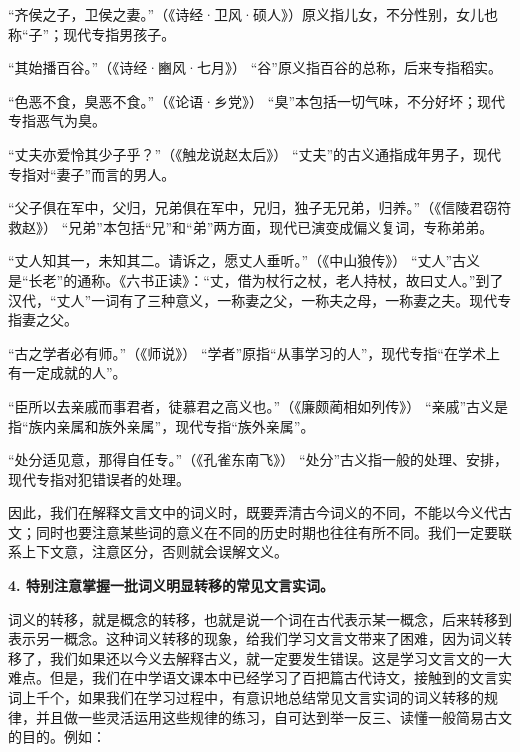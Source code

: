 \begin{entry}
\item[子：]“齐侯之子，卫侯之妻。”（《诗经·卫风·硕人》）原义指儿女，不分性别，女儿也称“子”；现代专指男孩子。

\item[谷：]“其始播百谷。”（《诗经·豳风·七月》） “谷”原义指百谷的总称，后来专指稻实。

\item[臭：]“色恶不食，臭恶不食。”（《论语·乡党》） “臭”本包括一切气味，不分好坏；现代专指恶气为臭。

\item[丈夫：]“丈夫亦爱怜其少子乎？”（《触龙说赵太后》）
“丈夫”的古义通指成年男子，现代专指对“妻子”而言的男人。

\item[兄弟：]“父子俱在军中，父归，兄弟俱在军中，兄归，独子无兄弟，归养。”（《信陵君窃符救赵》）
“兄弟”本包括“兄”和“弟”两方面，现代已演变成偏义复词，专称弟弟。

\item[丈人：]“丈人知其一，未知其二。请诉之，愿丈人垂听。”（《中山狼传》） “丈人”古义是“长老”的通称。《六书正读》：“丈，借为杖行之杖，老人持杖，故曰丈人。”到了汉代，“丈人”一词有了三种意义，一称妻之父，一称夫之母，一称妻之夫。现代专指妻之父。

\item[学者：]“古之学者必有师。”（《师说》） “学者”原指“从事学习的人”，现代专指“在学术上有一定成就的人”。

\item[亲戚：]“臣所以去亲戚而事君者，徒慕君之高义也。”（《廉颇蔺相如列传》） “亲戚”古义是指“族内亲属和族外亲属”，现代专指“族外亲属”。

\item[处分：]“处分适见意，那得自任专。”（《孔雀东南飞》） “处分”古义指一般的处理、安排，现代专指对犯错误者的处理。
\end{entry}

因此，我们在解释文言文中的词义时，既要弄清古今词义的不同，不能以今义代古文；同时也要注意某些词的意义在不同的历史时期也往往有所不同。我们一定要联系上下文意，注意区分，否则就会误解文义。

\textbf{4. 特别注意掌握一批词义明显转移的常见文言实词。}

词义的转移，就是概念的转移，也就是说一个词在古代表示某一概念，后来转移到表示另一概念。这种词义转移的现象，给我们学习文言文带来了困难，因为词义转移了，我们如果还以今义去解释古义，就一定要发生错误。这是学习文言文的一大难点。但是，我们在中学语文课本中已经学习了百把篇古代诗文，接触到的文言实词上千个，如果我们在学习过程中，有意识地总结常见文言实词的词义转移的规律，并且做一些灵活运用这些规律的练习，自可达到举一反三、读懂一般简易古文的目的。例如：

